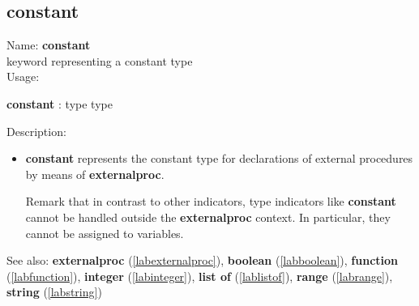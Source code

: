 \subsection{constant}
\label{labconstant}
\noindent Name: \textbf{constant}\\
keyword representing a \textsf{constant} type \\
\noindent Usage: 
\begin{center}
\textbf{constant} : \textsf{type type}
\\ 
\end{center}
\noindent Description: \begin{itemize}

\item \textbf{constant} represents the \textsf{constant} type for declarations
   of external procedures by means of \textbf{externalproc}.
    
   Remark that in contrast to other indicators, type indicators like
   \textbf{constant} cannot be handled outside the \textbf{externalproc} context.  In
   particular, they cannot be assigned to variables.
\end{itemize}
See also: \textbf{externalproc} (\ref{labexternalproc}), \textbf{boolean} (\ref{labboolean}), \textbf{function} (\ref{labfunction}), \textbf{integer} (\ref{labinteger}), \textbf{list of} (\ref{lablistof}), \textbf{range} (\ref{labrange}), \textbf{string} (\ref{labstring})
